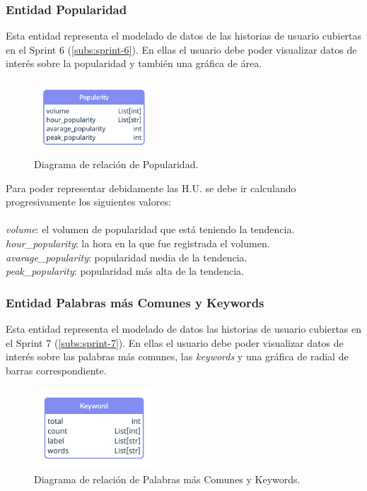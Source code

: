\subsubsection{Entidad Popularidad}\label{subsub:ent-popularidad}
Esta entidad representa el modelado de datos de las historias de usuario cubiertas en el Sprint 6 (\ref{subs:sprint-6}). En ellas el usuario debe poder visualizar datos de interés sobre la popularidad y también una gráfica de área.
\begin{figure}[H]
    \centering
    \myfloatalign
    \includegraphics[width=0.4\textwidth]{gfx/diagrama-er1.png}
    \caption[Diagrama de relación de Popularidad]{Diagrama de relación de Popularidad.}\label{gfx:diagrama-er1}
\end{figure}

Para poder representar debidamente las H.U. se debe ir calculando progresivamente los siguientes valores:
\\\\
\textit{volume}: el volumen de popularidad que está teniendo la tendencia.  \\
\textit{hour\_popularity}: la hora en la que fue registrada el volumen.    \\
\textit{avarage\_popularity}: popularidad media de la tendencia.    \\
\textit{peak\_popularity}: popularidad más alta de la tendencia.

\subsubsection{Entidad Palabras más Comunes y Keywords}\label{subsub:ent-keywords}
Esta entidad representa el modelado de datos las historias de usuario cubiertas en el Sprint 7 (\ref{subs:sprint-7}). En ellas el usuario debe poder visualizar datos de interés sobre las palabras más comunes, las \textit{keywords} y una gráfica de radial de barras correspondiente.
\begin{figure}[H]
    \centering
    \myfloatalign
    \includegraphics[width=0.4\textwidth]{gfx/diagrama-er2.png}
    \caption[Diagrama de relación de Palabras más Comunes y Keywords]{Diagrama de relación de Palabras más Comunes y Keywords.}\label{gfx:diagrama-er2}
\end{figure}

